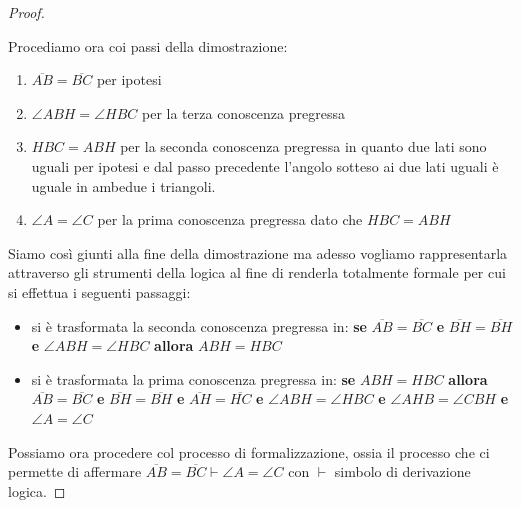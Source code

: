 \begin{proof}
\begin{enumerate}
\end{enumerate}
Procediamo ora coi passi della dimostrazione:
\begin{enumerate}
\item $\overline{AB}=\overline{BC}$ per ipotesi
\item $\angle ABH = \angle HBC$ per la terza conoscenza pregressa
\item $HBC = ABH$ per la seconda conoscenza pregressa in quanto due lati sono uguali per ipotesi e dal passo precedente
      l'angolo sotteso ai due lati uguali è uguale in ambedue i triangoli.
\item $\angle A= \angle C$ per la prima conoscenza pregressa dato che $HBC = ABH$
\end{enumerate}
Siamo così giunti alla fine della dimostrazione ma adesso vogliamo rappresentarla attraverso gli strumenti della logica al fine di renderla
totalmente formale per cui si effettua i seguenti passaggi:
\begin{itemize}
\item si è trasformata la seconda conoscenza pregressa in:\newline
  \textbf{se} $\overline{AB}=\overline{BC}$ \textbf{e} $\overline{BH}=\overline{BH}$ \textbf{e} $\angle ABH = \angle HBC$
  \textbf{allora} $ABH = HBC$
\item si è trasformata la prima conoscenza pregressa in:\newline
  \textbf{se} $ABH = HBC$ \textbf{allora} $\overline{AB}=\overline{BC}$ \textbf{e} $\overline{BH}=\overline{BH}$
  \textbf{e} $\overline{AH}=\overline{HC}$ \textbf{e} $\angle ABH = \angle HBC$ \textbf{e} $\angle AHB = \angle CBH$ \textbf{e} $\angle A=\angle C$
\end{itemize}
Possiamo ora procedere col processo di formalizzazione, ossia il processo che ci permette di affermare
$\overline{AB} = \overline{BC} \vdash \angle A = \angle C$ con $\vdash$ simbolo di derivazione logica.


\end{proof}
